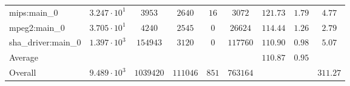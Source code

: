\begin{tabular}{|l|c|c|c|c|c|c|c|c|}
mips:main\_0            & $ 3.247 \cdot 10^{1} $ & $ 3953    $ & $ 2640   $ & $ 16  $ & $ 3072   $ & $ 121.73      $ & $ 1.79    $ & $ 4.77    $ \\
mpeg2:main\_0           & $ 3.705 \cdot 10^{1} $ & $ 4240    $ & $ 2545   $ & $ 0   $ & $ 26624  $ & $ 114.44      $ & $ 1.26    $ & $ 2.79    $ \\
sha\_driver:main\_0     & $ 1.397 \cdot 10^{3} $ & $ 154943  $ & $ 3120   $ & $ 0   $ & $ 117760 $ & $ 110.90      $ & $ 0.98    $ & $ 5.07    $ \\
\hline
Average                 & $                    $ & $         $ & $        $ & $     $ & $        $ & $ 110.87      $ & $ 0.95    $ & $         $ \\
\hline
Overall                 & $ 9.489 \cdot 10^{3} $ & $ 1039420 $ & $ 111046 $ & $ 851 $ & $ 763164 $ & $             $ & $         $ & $ 311.27  $ \\
\hline
\end{tabular}
